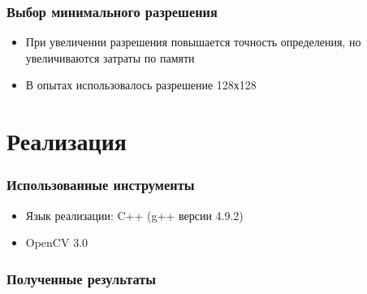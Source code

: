 \documentclass[14pt]{beamer}
\begin{document}
\begin{frame}
\frametitle{Выбор минимального разрешения}
\begin{itemize}
  \item При увеличении разрешения повышается точность определения, но увеличиваются затраты по памяти
  \item В опытах использовалось разрешение 128х128
\end{itemize}
\end{frame}

\section{Реализация}
\begin{frame}
\frametitle{Использованные инструменты}
\begin{itemize}
  \item Язык реализации: C++ (g++ версии 4.9.2)
  \item OpenCV 3.0
\end{itemize}
\end{frame}

\begin{frame}
\frametitle{Полученные результаты}

\end{frame}
\end{document}
